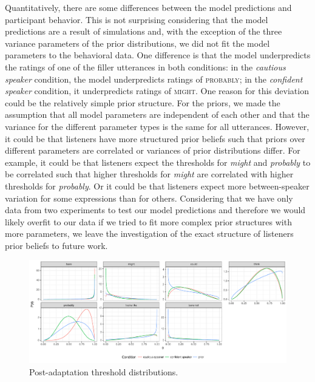 \documentclass[lucida,biblatex]{sp} %
\begin{document}
Quantitatively, there are some differences between the model predictions and participant behavior. This is not surprising considering that the model predictions are a result of simulations
and, with the exception of the three variance parameters of the prior distributions, we did not fit the model parameters to the behavioral data. One difference is that the model underpredicts 
the ratings of one of the filler utterances in both conditions: in the \textit{cautious speaker} condition, the model underpredicts ratings of \textsc{probably}; in the \textit{confident speaker} condition, it underpredicts
ratings of \textsc{might}. One reason for this deviation could be the relatively simple prior structure. For the priors, we made the assumption that all model parameters are independent of each other and 
that the variance for the different parameter types is the same for all utterances. However, it could be that listeners have more structured prior beliefs such that priors over different parameters are correlated or
variances of prior distributions differ. For example, it could be that listeners expect the thresholds for \textit{might} and \textit{probably} to be correlated such that higher thresholds for \textit{might} are correlated 
with higher thresholds for \textit{probably}. Or it could be that listeners expect more between-speaker variation for some expressions than for others. Considering that we have only data from two experiments to test
our model predictions and therefore we would likely overfit to our data if we tried to fit more complex prior structures with more parameters, we leave  the investigation of the exact structure of listeners prior beliefs to future work.

\begin{figure}
  \includegraphics[width=\textwidth]{plots/adaptation-posterior-thresholds.pdf}
  \caption{Post-adaptation threshold distributions. \label{fig:post-exposure-thresholds}}
\end{figure}
\end{document}

